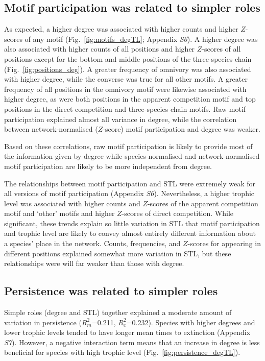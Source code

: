 \documentclass[12pt]{article}
\begin{document}
\begin{spacing}{2.0}
    \subsection*{Motif participation was related to simpler roles}    
    
        As expected, a higher degree was associated with higher counts and higher $Z$-scores of any motif (Fig.~\ref{fig:motifs_degTL}; Appendix \emph{S6}).
        A higher degree was also associated with higher counts of all positions and higher $Z$-scores of all positions except for the bottom and middle positions of the three-species chain (Fig.~\ref{fig:positions_deg}).
        A greater frequency of omnivory was also associated with higher degree, while the converse was true for all other motifs.
        A greater frequency of all positions in the omnivory motif were likewise associated with higher degree, as were both positions in the apparent competition motif and top positions in the direct competition and three-species chain motifs.
        Raw motif participation explained almost all variance in degree, while the correlation between network-normalised ($Z$-score) motif participation and degree was weaker.

        Based on these correlations, raw motif participation is likely to provide most of the information given by degree while species-normalised and network-normalised motif participation are likely to be more independent from degree.
        
    
        The relationships between motif participation and STL were extremely weak for all versions of motif participation (Appendix \emph{S6}).
        Nevertheless, a higher trophic level was associated with higher counts and $Z$-scores of the apparent competition motif and `other' motifs and higher $Z$-scores of direct competition.
        While significant, these trends explain so little variation in STL that motif participation and trophic level are likely to convey almost entirely different information about a species' place in the network.
        Counts, frequencies, and $Z$-scores for appearing in different positions explained somewhat more variation in STL, but these relationships were will far weaker than those with degree.
    

    \subsection*{Persistence was related to simpler roles}
    
        Simple roles (degree and STL) together explained a moderate amount of variation in persistence ($R^2_m$=0.211, $R^2_c$=0.232).
        Species with higher degrees and lower trophic levels tended to have longer mean times to extinction (Appendix \emph{S7}).
        However, a negative interaction term means that an increase in degree is less beneficial for species with high trophic level (Fig.~\ref{fig:persistence_degTL}).
    

\end{spacing}
\end{document}
